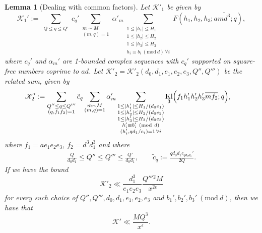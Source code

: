\documentclass[10pt]{amsart}
\theoremstyle{plain}
\newtheorem{lmm}[thrm]{Lemma}
\numberwithin{equation}{section}
\DeclareMathOperator{\Kl}{Kl}
\newcommand{\Mod}[1]{\ (\mathrm{mod}\ #1)}
\begin{document}
\begin{lmm}[Dealing with common factors]\label{lmm:K2}
Let $\mathscr{K}'_1$ be given by
\[
\mathscr{K}_1':=\sum_{\substack{Q\le q \le Q'}}c_q'\sum_{\substack{m\sim M\\ (m,q)=1}}\alpha'_m\sum_{\substack{1\le |h_1|\le H_1 \\ 1\le |h_2|\le H_2\\ 1\le |h_3|\le H_3\\ h_i\equiv b_i\Mod{d}\,\forall i}}F(h_1,h_2,h_3;a\overline{m d^3};q),
\]
where $c_q'$ and $\alpha_m'$ are 1-bounded complex sequences with $c_q'$ supported on square-free numbers coprime to $ad$.
 Let $\mathscr{K}'_2=\mathscr{K}'_2(d_0,d_1,e_1,e_2,e_3,Q'',Q''')$ be the related sum, given by
\begin{align*}
\mathscr{K}'_2&:=\sum_{\substack{Q''\le q\le Q'''\\ (q,f_1f_2)=1}}\tilde{c}_{q}\sum_{\substack{m\sim M\\ (m,q)=1}}\alpha'_m\sum_{\substack{1\le |h_1'|\le H_1/(d_0e_1)\\ 1\le |h_2'|\le H_2/(d_0e_2) \\ 1\le |h_3'|\le H_3/(d_0e_3)\\ h_i'\equiv b_i'\Mod{d}\\ (h_i',q d_1/e_i)=1\,\forall i}}\Kl_3\Bigl(f_1 h_1'h_2'h_3'\overline{m f_2};q\Bigr),
\end{align*}
where $f_1= a e_1e_2e_3$, $f_2=d^3d_1^3$ and where
\begin{align*}
\frac{Q}{d_0d_1}\le Q''\le Q'''\le \frac{Q'}{d_0d_1},\qquad \tilde{c}_{q}:=\frac{q d_0d_1 c_{q d_0 d_1}'}{2 Q}. 
\end{align*}
If we have the bound
\[
\mathscr{K}'_2\ll \frac{d_1^3}{e_1 e_2 e_3}\frac{Q'''{}^2 M}{x^{2\epsilon}}
\]
for every such choice of $Q'',Q''',d_0,d_1,e_1,e_2,e_3$ and $b_1',b_2',b_3'\Mod{d}$, then we have that
\[
\mathscr{K}'\ll \frac{M Q^3}{x^\epsilon}.
\]
\end{lmm}
%
%
%
%
\end{document}

